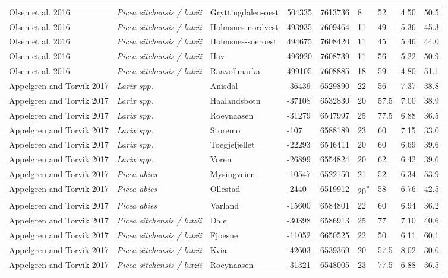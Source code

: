 \documentclass[
]{article}
\begin{document}
\begin{landscape}
\begin{longtable}[t]{l>{}llllllll}
Olsen et al. 2016 & \em{Picea sitchensis / lutzii} & Gryttingdalen-oest & 504335 & 7613736 & 8 & 52 & 4.50 & 50.5\\
Olsen et al. 2016 & \em{Picea sitchensis / lutzii} & Holmsnes-nordvest & 493935 & 7609464 & 11 & 49 & 5.36 & 45.3\\
Olsen et al. 2016 & \em{Picea sitchensis / lutzii} & Holmsnes-soeroest & 494675 & 7608420 & 11 & 45 & 5.46 & 44.0\\
\addlinespace
Olsen et al. 2016 & \em{Picea sitchensis / lutzii} & Hov & 496920 & 7608739 & 11 & 56 & 5.22 & 50.9\\
Olsen et al. 2016 & \em{Picea sitchensis / lutzii} & Raavollmarka & 499105 & 7608885 & 18 & 59 & 4.80 & 51.1\\
Appelgren and Torvik 2017 & \em{Larix spp.} & Anisdal & -36439 & 6529890 & 22 & 56 & 7.37 & 38.8\\
Appelgren and Torvik 2017 & \em{Larix spp.} & Haalandsbotn & -37108 & 6532830 & 20 & 57.5 & 7.00 & 38.9\\
Appelgren and Torvik 2017 & \em{Larix spp.} & Roeynaasen & -31279 & 6547997 & 25 & 77.5 & 6.88 & 36.5\\
\addlinespace
Appelgren and Torvik 2017 & \em{Larix spp.} & Storemo & -107 & 6588189 & 23 & 60 & 7.15 & 33.0\\
Appelgren and Torvik 2017 & \em{Larix spp.} & Toegjefjellet & -22293 & 6546411 & 20 & 60 & 6.69 & 39.6\\
Appelgren and Torvik 2017 & \em{Larix spp.} & Voren & -26899 & 6554824 & 20 & 62 & 6.42 & 39.6\\
Appelgren and Torvik 2017 & \em{Picea abies} & Mysingveien & -10547 & 6522150 & 21 & 52 & 6.34 & 53.9\\
Appelgren and Torvik 2017 & \em{Picea abies} & Ollestad & -2440 & 6519912 & 20\textsuperscript{*} & 58 & 6.76 & 42.5\\
\addlinespace
Appelgren and Torvik 2017 & \em{Picea abies} & Varland & -15600 & 6584801 & 22 & 60 & 6.94 & 36.2\\
Appelgren and Torvik 2017 & \em{Picea sitchensis / lutzii} & Dale & -30398 & 6586913 & 25 & 77 & 7.10 & 40.6\\
Appelgren and Torvik 2017 & \em{Picea sitchensis / lutzii} & Fjoesne & -11052 & 6650525 & 22 & 50 & 6.11 & 60.1\\
Appelgren and Torvik 2017 & \em{Picea sitchensis / lutzii} & Kvia & -42603 & 6539369 & 20 & 57.5 & 8.02 & 30.6\\
Appelgren and Torvik 2017 & \em{Picea sitchensis / lutzii} & Roeynaasen & -31321 & 6548005 & 23 & 77.5 & 6.88 & 36.5\\

\end{longtable}
\end{landscape}
\end{document}
